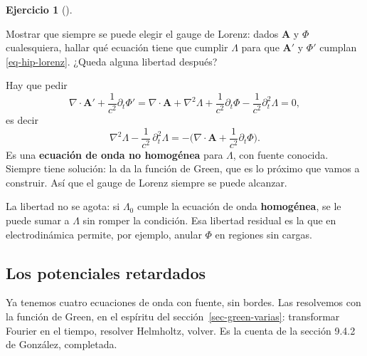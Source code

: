 \documentclass[
  spanish,
  a4paper,
]{scrbook}
\theoremstyle{definition}
\theoremstyle{plain}
\theoremstyle{definition}
\theoremstyle{plain}
\theoremstyle{definition}
\newtheorem{exercise}{Ejercicio}[chapter]
\theoremstyle{remark}
\begin{document}
\begin{exercise}[]\protect\hypertarget{exr-hip-lorenz-existe}{}\label{exr-hip-lorenz-existe}

Mostrar que siempre se puede elegir el gauge de Lorenz: dados
\(\mathbf A\) y \(\Phi\) cualesquiera, hallar qué ecuación tiene que
cumplir \(\Lambda\) para que \(\mathbf A'\) y \(\Phi'\) cumplan
\ref{eq-hip-lorenz}. ¿Queda alguna libertad después?

\end{exercise}

\begin{tcolorbox}[enhanced jigsaw, arc=.35mm, bottomrule=.15mm, bottomtitle=1mm, breakable, colback=white, colbacktitle=quarto-callout-tip-color!10!white, colframe=quarto-callout-tip-color-frame, coltitle=black, left=2mm, leftrule=.75mm, opacityback=0, opacitybacktitle=0.6, rightrule=.15mm, title=\textcolor{quarto-callout-tip-color}{\faLightbulb}\hspace{0.5em}{Solución}, titlerule=0mm, toprule=.15mm, toptitle=1mm]

Hay que pedir \[
\nabla\cdot\mathbf A' + \frac{1}{c^2}\partial_t\Phi' = \nabla\cdot\mathbf A + \nabla^2\Lambda + \frac{1}{c^2}\partial_t\Phi - \frac{1}{c^2}\partial_t^2\Lambda = 0,
\] es decir \[
\nabla^2\Lambda - \frac{1}{c^2}\,\partial_t^2\Lambda = -\Big(\nabla\cdot\mathbf A + \frac{1}{c^2}\partial_t\Phi\Big).
\] Es una \textbf{ecuación de onda no homogénea} para \(\Lambda\), con
fuente conocida. Siempre tiene solución: la da la función de Green, que
es lo próximo que vamos a construir. Así que el gauge de Lorenz siempre
se puede alcanzar.

La libertad no se agota: si \(\Lambda_0\) cumple la ecuación de onda
\textbf{homogénea}, se le puede sumar a \(\Lambda\) sin romper la
condición. Esa libertad residual es la que en electrodinámica permite,
por ejemplo, anular \(\Phi\) en regiones sin cargas.

\end{tcolorbox}

\subsection{Los potenciales retardados}\label{sec-hip-retardados}

Ya tenemos cuatro ecuaciones de onda con fuente, sin bordes. Las
resolvemos con la función de Green, en el espíritu del
sección~\ref{sec-green-varias}: transformar Fourier en el tiempo,
resolver Helmholtz, volver. Es la cuenta de la sección 9.4.2 de
González, completada.
\end{document}
